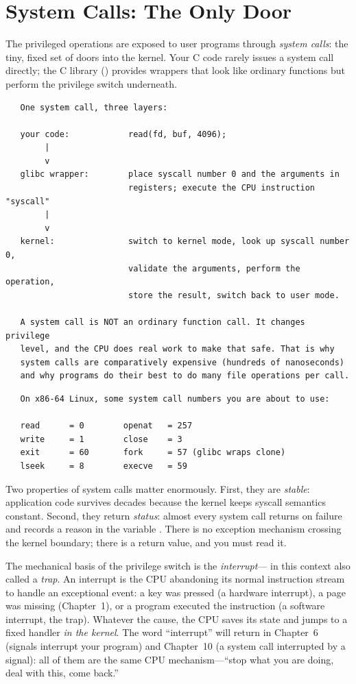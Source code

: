 \section{System Calls: The Only Door}

The privileged operations are exposed to user programs through
\emph{system calls}: the tiny, fixed set of doors into the kernel.
Your C code rarely issues a system call directly; the C library
() provides wrappers that look like ordinary functions but
perform the privilege switch underneath.

\begin{verbatim}
   One system call, three layers:

   your code:            read(fd, buf, 4096);
        |
        v
   glibc wrapper:        place syscall number 0 and the arguments in
                         registers; execute the CPU instruction "syscall"
        |
        v
   kernel:               switch to kernel mode, look up syscall number 0,
                         validate the arguments, perform the operation,
                         store the result, switch back to user mode.

   A system call is NOT an ordinary function call. It changes privilege
   level, and the CPU does real work to make that safe. That is why
   system calls are comparatively expensive (hundreds of nanoseconds)
   and why programs do their best to do many file operations per call.
\end{verbatim}

\begin{verbatim}
   On x86-64 Linux, some system call numbers you are about to use:

   read      = 0        openat   = 257
   write     = 1        close    = 3
   exit      = 60       fork     = 57 (glibc wraps clone)
   lseek     = 8        execve   = 59
\end{verbatim}

Two properties of system calls matter enormously. First, they are
\emph{stable}: application code survives decades because the kernel
keeps syscall semantics constant. Second, they return
\emph{status}: almost every system call returns  on failure
and records a reason in the variable . There is no
exception mechanism crossing the kernel boundary; there is a return
value, and you must read it.

The mechanical basis of the privilege switch is the \emph{interrupt}---
in this context also called a \emph{trap}. An interrupt is the CPU
abandoning its normal instruction stream to handle an exceptional
event: a key was pressed (a hardware interrupt), a page was missing
(Chapter~1), or a program executed the  instruction (a
software interrupt, the trap). Whatever the cause, the CPU saves its
state and jumps to a fixed handler \emph{in the kernel}. The word
``interrupt'' will return in Chapter~6 (signals interrupt your
program) and Chapter~10 (a system call interrupted by a signal): all
of them are the same CPU mechanism---``stop what you are doing, deal
with this, come back.''

